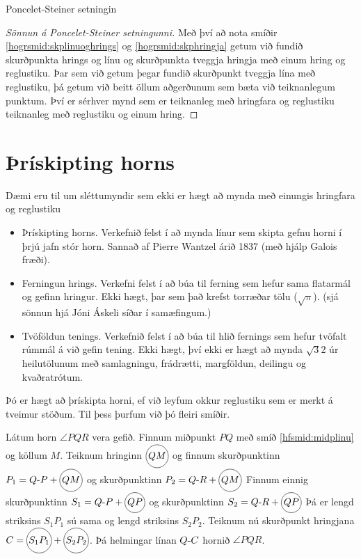 \begin{frame}{Poncelet-Steiner setningin}
  \begin{proof}[Sönnun á Poncelet-Steiner setningunni]
    Með því að nota smíðir \ref{hogrsmid:skplinuoghrings} og \ref{hogrsmid:skphringja}
    getum við fundið skurðpunkta hrings og línu og skurðpunkta
    tveggja hringja með einum hring og reglustiku. Þar sem við getum þegar
    fundið skurðpunkt tveggja lína með reglustiku, þá getum við  beitt öllum
    aðgerðunum sem bæta við teiknanlegum punktum. Því er sérhver mynd sem er
    teiknanleg með hringfara og reglustiku teiknanleg með reglustiku og einum
    hring.
\end{proof}
\end{frame}

\section{Þrískipting horns}

\begin{frame}
  Dæmi eru til um sléttumyndir sem ekki er hægt að mynda með einungis hringfara og reglustiku
\begin{itemize}
\item Þrískipting horns. Verkefnið felst í að mynda línur sem skipta gefnu horni í þrjú jafn stór horn. Sannað af Pierre Wantzel árið 1837 (með hjálp Galois fræði).
\item Ferningun hrings. Verkefni felst í að búa til ferning sem hefur sama flatarmál og 
gefinn hringur. Ekki hægt, þar sem það krefst torræðar tölu (\(\sqrt{\pi}\)). (sjá sönnun hjá Jóni Áskeli síðar í samæfingum.)
\item Tvöföldun tenings. Verkefnið felst í að búa til hlið fernings sem hefur tvöfalt rúmmál á við gefin tening. Ekki hægt, því ekki er hægt að mynda \(\sqrt{3}{2}\) úr heilutölunum með
samlagningu, frádrætti, margföldun, deilingu og kvaðratrótum.
\end{itemize}
\end{frame}

\begin{frame}
  Þó er hægt að þrískipta horni, ef við leyfum okkur reglustiku sem er merkt
  á tveimur stöðum. Til þess þurfum við þó fleiri smíðir.
\end{frame}

\begin{frame}
  \begin{smid}
    \label{smid:tviskiptinghorns}
    Látum horn \(\angle PQR\) vera gefið.
    Finnum miðpunkt \(PQ\) með smíð \ref{hfsmid:midplinu}
    og köllum \(M\).
    Teiknum hringinn \(\hri{QM}\) og finnum skurðpunktinn
    \(P_1 = \lin{Q}{P}+\hri{QM}\)  og skurðpunktinn \(P_2 = \lin{Q}{R}+\hri{QM}\)
    Finnum einnig  skurðpunktinn
    \(S_1 = \lin{Q}{P}+\hri{QP}\)  og skurðpunktinn \(S_2 = \lin{Q}{R}+\hri{QP}\)
    Þá er lengd striksins \(S_1P_1\) sú sama og lengd striksins
    \(S_2P_2\).
    Teiknum nú skurðpunkt hringjana
    \(C = \hri{S_1P_1}+\hri{S_2P_2}\).
    Þá helmingar línan \(\lin{Q}{C}\) hornið \(\angle PQR\).
  \end{smid}
\end{frame}

